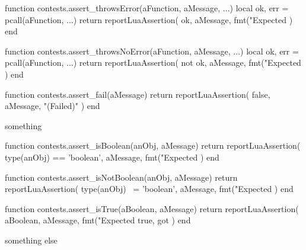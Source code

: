 \stopLuaCode


\startLuaCode
function contests.assert_throwsError(aFunction, aMessage, ...)
  local ok, err = pcall(aFunction, ...)
  return reportLuaAssertion(
    ok,
    aMessage,
    fmt("Expected %
  )
end
\stopLuaCode

\stopTestSuite


\startLuaCode
function contests.assert_throwsNoError(aFunction, aMessage, ...)
  local ok, err = pcall(aFunction, ...)
  return reportLuaAssertion(
    not ok,
    aMessage,
    fmt("Expected %
  )
end
\stopLuaCode

\stopTestSuite


\startLuaCode
function contests.assert_fail(aMessage)
  return reportLuaAssertion(
    false,
    aMessage,
    "(Failed)"
  )
end
\stopLuaCode


\startLuaTest
  something
\stopLuaTest

\stopTestCase
\stopTestSuite


\startLuaCode
function contests.assert_isBoolean(anObj, aMessage)
  return reportLuaAssertion(
    type(anObj) == 'boolean',
    aMessage,
    fmt("Expected %
  )
end
\stopLuaCode

\stopTestSuite


\startLuaCode
function contests.assert_isNotBoolean(anObj, aMessage)
  return reportLuaAssertion(
    type(anObj) ~= 'boolean',
    aMessage,
    fmt("Expected %
  )
end
\stopLuaCode

\stopTestSuite


\startLuaCode
function contests.assert_isTrue(aBoolean, aMessage)
  return reportLuaAssertion(
    aBoolean,
    aMessage,
    fmt("Expected true, got %
  )
end
\stopLuaCode


\startLuaTest
  something else
\stopLuaTest

